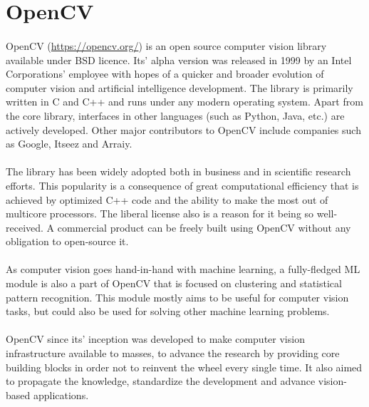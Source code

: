  
\lstset{style=mystyle}

\section{OpenCV}
\paragraph{}
OpenCV (\url{https://opencv.org/}) is an open source computer vision library available under BSD licence. Its' alpha version was released in 1999 by an Intel Corporations' employee with hopes of a quicker and broader evolution of computer vision and artificial intelligence development. The library is primarily written in C and C++ and runs under any modern operating system. Apart from the core library, interfaces in other languages (such as Python, Java, etc.) are actively developed. Other major contributors to OpenCV include companies such as Google, Itseez and Arraiy.\cite{learning-opencv-3}
\paragraph{}
The library has been widely adopted both in business and in scientific research efforts. This popularity is a consequence of great computational efficiency that is achieved by optimized C++ code and the ability to make the most out of multicore processors. The liberal license also is a reason for it being so well-received. A commercial product can be freely built using OpenCV without any obligation to open-source it.
\paragraph{}
As computer vision goes hand-in-hand with machine learning, a fully-fledged ML module is also a part of OpenCV that is focused on clustering and statistical pattern recognition. This module mostly aims to be useful for computer vision tasks, but could also be used for solving other machine learning problems.
\paragraph{}
OpenCV since its' inception was developed to make computer vision infrastructure available to masses, to advance the research by providing core building blocks in order not to reinvent the wheel every single time. It also aimed to propagate the knowledge, standardize the development and advance vision-based applications. 

